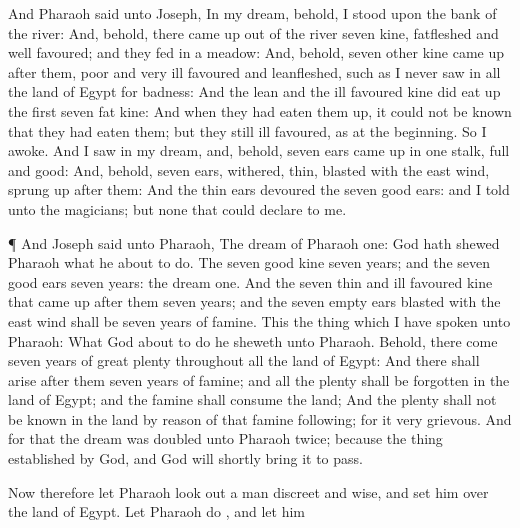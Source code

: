 {\par }{\PP {}And
Pharaoh
said unto
Joseph, In my
dream, behold, I
stood upon the
bank of the
river:
And, behold, there came
up out of the
river
seven
kine,
fatfleshed and
well
favoured; and they
fed in a
meadow:
And, behold,
seven
other
kine came
up after
them,
poor and
very
ill
favoured and
leanfleshed,
such as I
never
saw in all the
land of
Egypt for
badness:
And the
lean and the ill
favoured
kine did eat
up the
first
seven
fat
kine:
And when they had eaten them
up, it could not be
known that they had eaten
them; but they
{}
still ill
favoured, as at the
beginning. So I
awoke.
And I
saw in my
dream, and, behold,
seven
ears came
up in
one
stalk,
full and
good:
And, behold,
seven
ears,
withered,
thin,
{}
blasted with the east
wind, sprung
up after
them:
And the
thin
ears
devoured the
seven
good
ears: and I
told
{} unto the
magicians; but
{} none that could
declare
{} to me.
\par }{\PP {}¶ And
Joseph
said unto
Pharaoh, The
dream of
Pharaoh
{}
one:
God hath
shewed
Pharaoh what he
{} about to
do.
The
seven
good
kine
{}
seven
years; and the
seven
good
ears
{}
seven
years: the
dream
{}
one.
And the
seven
thin and ill
favoured
kine that came
up after
them
{}
seven
years; and the
seven
empty
ears
blasted with the east
wind shall be
seven
years of
famine.
This
{} the
thing which I have
spoken unto
Pharaoh: What
God
{} about to
do he
sheweth unto
Pharaoh.
Behold, there
come
seven
years of
great
plenty throughout all the
land of
Egypt:
And there shall
arise after
them
seven
years of
famine; and all the
plenty shall be
forgotten in the
land of
Egypt; and the
famine shall
consume the
land;
And the
plenty shall not be
known in the
land by
reason of that
famine
following; for it
{}
very
grievous.
And for that the
dream was
doubled unto
Pharaoh
twice;
{} because the
thing
{}
established
by
God, and
God will
shortly bring it to
pass.
\par }{\PP {}Now therefore let
Pharaoh look
out a
man
discreet and
wise, and
set him over the
land of
Egypt.
Let
Pharaoh
do
{}, and let him
}
